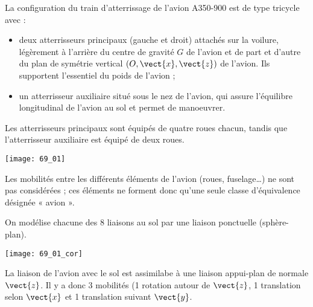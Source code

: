 \normaltrue \difficilefalse \tdifficilefalse
\correctiontrue

\setcounter{question}{0}%


\ifcorrection
\else
{}
\fi

\ifprof
\else
La configuration du train d’atterrissage de l’avion A350-900 est de type tricycle avec :
\begin{itemize}
\item deux atterrisseurs principaux (gauche et droit) attachés sur la voilure, légèrement à
l’arrière du centre de gravité $G$ de l’avion et de part et d’autre du plan de symétrie
vertical $\left(O, \vect{x}, \vect{z}\right)$ de l'avion. Ils supportent l’essentiel du poids de l’avion ;
\item un atterrisseur auxiliaire situé sous le nez de l’avion, qui assure l’équilibre longitudinal
de l’avion au sol et permet de manoeuvrer.
\end{itemize}
Les atterrisseurs principaux sont équipés de quatre roues chacun, tandis que
l’atterrisseur auxiliaire est équipé de deux roues.



\begin{marginfigure}
\texttt{[image: 69\_01]}
\end{marginfigure}

Les mobilités entre les différents éléments de l’avion (roues,
fuselage…) ne sont pas considérées ; ces éléments ne forment donc qu’une seule
classe d’équivalence désignée « avion ».

\fi

On modélise chacune des 8 liaisons au sol par une liaison ponctuelle (sphère-plan).
\ifprof
\begin{center}
\texttt{[image: 69\_01\_cor]}
\end{center}
\else 
\fi

\ifprof
La liaison de l'avion avec le sol est assimilabe à une liaison appui-plan de normale $\vect{z}$. Il y a donc 3 mobilités (1 rotation autour de $\vect{z}$, 1 translation selon $\vect{x}$ et 1 translation suivant $\vect{y}$.

